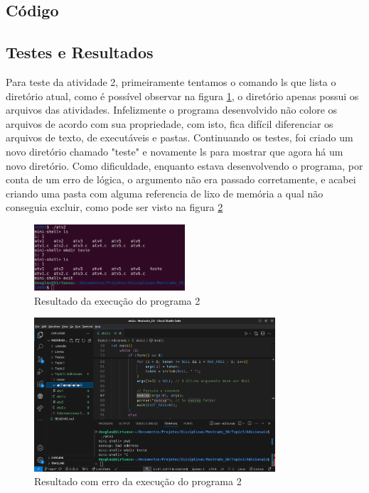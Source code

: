 \documentclass{article}
\begin{document}
\subsection{Código}

\subsection{Testes e Resultados}
Para teste da atividade 2, primeiramente tentamos o comando ls que lista o diretório atual, como é possível observar na figura \ref{fig:atv2_result}, o diretório apenas possui os arquivos das atividades. Infelizmente o programa desenvolvido não colore os arquivos de acordo com sua propriedade, com isto, fica difícil diferenciar os arquivos de texto, de executáveis e pastas. Continuando os testes, foi criado um novo diretório chamado "teste" e novamente ls para mostrar que agora há um novo diretório. Como dificuldade, enquanto estava desenvolvendo o programa, por conta de um erro de lógica, o argumento não era passado corretamente, e acabei criando uma pasta com alguma referencia de lixo de memória a qual não conseguia excluir, como pode ser visto na figura \ref{fig:atv2_err}

\begin{figure}[ht]
    \centering
    \includegraphics[width=0.5\textwidth]{./Images/atv2_result.png}
    \caption{Resultado da execução do programa 2}
    \label{fig:atv2_result}
\end{figure}

\begin{figure}[ht]
    \centering
    \includegraphics[width=0.8\textwidth]{./Images/atv2_err.png}
    \caption{Resultado com erro da execução do programa 2}
    \label{fig:atv2_err}
\end{figure}
\end{document}
